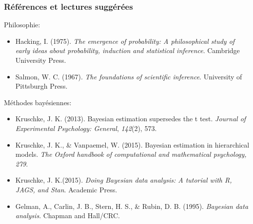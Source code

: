 \documentclass{beamer}
\begin{document}
\begin{frame}
    \frametitle{Références et lectures suggérées}

    Philosophie:
    \begin{itemize}
      \item Hacking, I. (1975). \emph{The emergence of probability:
            A philosophical study of early ideas about probability,
            induction and statistical inference}. Cambridge University Press.
      \item Salmon, W. C. (1967). \emph{The foundations of scientific inference}.
            University of Pittsburgh Press.
    \end{itemize}

    Méthodes bayésiennes:
    \begin{itemize}
      \item Kruschke, J. K. (2013). Bayesian estimation supersedes the t test.
            \emph{Journal of Experimental Psychology: General}, \emph{142}(2), 573.
      \item Kruschke, J. K., \& Vanpaemel, W. (2015). Bayesian estimation in hierarchical models.
            \emph{The Oxford handbook of computational and mathematical psychology, 279}.
      \item Kruschke, J. K.(2015). \emph{Doing Bayesian data analysis: A tutorial with R, JAGS, and Stan}.
            Academic Press.
      \item Gelman, A., Carlin, J. B., Stern, H. S., \& Rubin, D. B. (1995).
            \emph{Bayesian data analysis}. Chapman and Hall/CRC.
    \end{itemize}
\end{frame}


\end{document}
